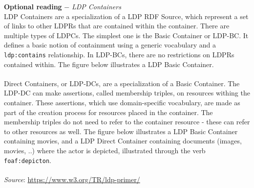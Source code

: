 \begin{formal}
\textbf{Optional reading} $ - $
\textit{LDP Containers}\\

\noindent LDP Containers are a specialization of a LDP RDF Source, which represent a set of links to other LDPRs that are contained within the container. There are multiple types of LDPCs. The simplest one is the Basic Container or LDP-BC. It defines a basic notion of containment using a generic vocabulary and a \texttt{ldp:contains} relationship. In LDP-BCs, there are no restrictions on LDPRs contained within. The figure below illustrates a LDP Basic Container.\\
\\
\noindent Direct Containers, or LDP-DCs, are a specialization of a Basic Container. The LDP-DC can make assertions, called membership triples, on resources withing the container. These assertions, which use domain-specific vocabulary, are made as part of the creation process for resources placed in the container. The membership triples do not need to refer to the container resource - these can refer to other resources as well. The figure below illustrates a LDP Basic Container containing movies, and a LDP Direct Container containing documents (images, movies, ..) where the actor is depicted, illustrated through the verb \texttt{foaf:depicton}. \\
\\

\noindent \textit{Source}: \url{https://www.w3.org/TR/ldp-primer/}
\end{formal}

